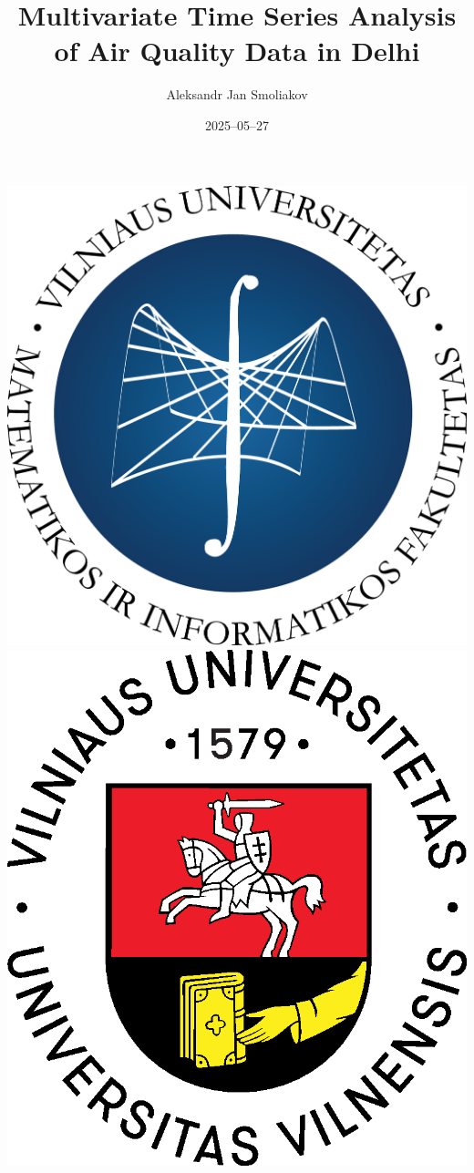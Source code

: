 \documentclass[svgnames, 12pt]{beamer}
\title[Air Quality Analysis in Delhi]{Multivariate Time Series Analysis of Air Quality Data in Delhi}
\author[A. J. Smoliakov]{Aleksandr Jan Smoliakov\inst{1}}
\institute[VU MIF]{\inst{1} Vilnius University, Faculty of Mathematics and Informatics}
\date{2025--05--27}
\begin{document}
\begin{frame}
	\includegraphics[scale=0.15]{MIF Garamond-logo.png} 
	\hfill
	\includegraphics[scale=0.15]{Logo_spalvotas.eps}
	\titlepage
\end{frame}
\end{document}
